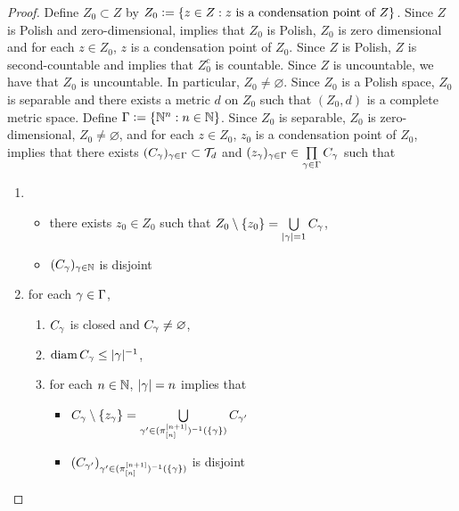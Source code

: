 \documentclass{book}
\begin{document}
	\begin{proof}
		Define $Z_0 \subset Z$ by $Z_0 \vcentcolon= \{z \in Z: \text{$z$ is a condensation point of $Z$}\}$. Since $Z$ is Polish and zero-dimensional,  implies that $Z_0$ is Polish, $Z_0$ is zero dimensional and for each $z \in Z_0$, $z$ is a condensation point of $Z_0$. Since $Z$ is Polish, $Z$ is second-countable and  implies that $Z_0^c$ is countable. Since $Z$ is uncountable, we have that $Z_0$ is uncountable. In particular, $Z_0 \neq \varnothing$. Since $Z_0$ is a Polish space, $Z_0$ is separable and there exists a metric $d$ on $Z_0$ such that $(Z_0, d)$ is a complete metric space. Define $\Gamma \vcentcolon= \{\mathbb{N}^n: n \in \mathbb{N}\}$. Since $Z_0$ is separable, $Z_0$ is zero-dimensional, $Z_0 \neq \varnothing$, and for each $z \in Z_0$, $z_0$ is a condensation point of $Z_0$,  implies that there exists $(C_{\gamma})_{\gamma \in \Gamma} \subset \mathcal{T}_d$ and $(z_{\gamma})_{\gamma \in \Gamma} \in \prod\limits_{\gamma \in \Gamma} C_{\gamma}$ such that 
		\begin{enumerate}
			\item 
			\begin{itemize}
				\item there exists $z_0 \in Z_0$ such that $Z_0 \setminus \{z_0\} = \bigcup\limits_{|\gamma| = 1} C_{\gamma}$,
				\item $(C_{\gamma})_{\gamma \in \mathbb{N}}$ is disjoint
			\end{itemize}
			\item for each $\gamma \in \Gamma$,
			\begin{enumerate}
				\item $C_{\gamma}$ is closed and $C_{\gamma} \neq \varnothing$,
				\item $\operatorname{\text{diam}} C_{\gamma} \leq |\gamma|^{-1}$,
				\item for each $n \in \mathbb{N}$, $|\gamma| = n$ implies that 
				\begin{itemize}
					\item $C_{\gamma} \setminus \{z_{\gamma}\} = \bigcup\limits_{\gamma' \in (\pi^{[n+1]}_{[n]})^{-1}(\{\gamma\})} C_{\gamma'}$
					\item $(C_{\gamma'})_{\gamma' \in (\pi^{[n+1]}_{[n]})^{-1}(\{\gamma\})}$ is disjoint
				\end{itemize}
			\end{enumerate} 
		\end{enumerate} 

\end{proof}
\end{document}
